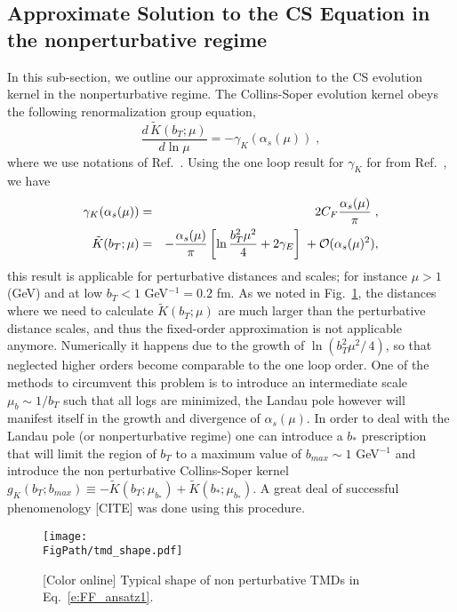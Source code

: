 \documentclass[final,3p,times,onecolumn,sort&compress,hidelinks]{elsarticle}
\newcommand*{\FigPath}{../Figs/}%
\begin{document}

\subsection{Approximate Solution to the CS Equation in the
	nonperturbative regime}

In this sub-section, we outline our approximate solution to the CS 
evolution kernel in the nonperturbative regime.  The Collins-Soper
evolution kernel obeys the following renormalization group equation,
%
\begin{equation}
\frac{d\, \tilde K (b_T;\mu)}{d \ln \mu} = - \gamma_K (\alpha_s(\mu)) \; ,
\end{equation} 
%
where we use notations of Ref.~\cite{Collins:2011zzd}. Using the one
loop result for $\gamma_K$ for from Ref.~\cite{Aybat:2011zv}, we have
%
\begin{eqnarray}
\gamma_K(\alpha_s(\mu)) &=& 2 C_F \frac{\alpha_s(\mu)}{\pi} \; ,\\
\tilde K (b_T;\mu) &=& -\frac{\alpha_s(\mu)}{\pi}  \left[\ln\frac{b_T^2 \mu^2}{4} + 2 \gamma_E
 \right] \; + {\cal O} (\alpha_s(\mu)^2),
 \label{e:CS_kernel}
\end{eqnarray}
%
this result is applicable for perturbative distances and scales; for 
instance $\mu > 1$ (GeV) and at low $b_T < 1$ GeV$^{-1} = 0.2$ fm. As we 
noted in Fig.~\ref{Fig:tmd_shape}, the distances where we need to 
calculate $\tilde K (b_T;\mu)$ are much larger than the perturbative 
distance scales, and thus the fixed-order approximation is not 
applicable anymore.  Numerically it happens due to the growth of 
$\ln\left(b_T^2 \mu^2/\, 4 \right) $, so that neglected higher orders 
become comparable to the one loop order. One of the methods to 
circumvent this problem is to introduce an intermediate scale $\mu_b 
\sim 1/b_T$ such that all logs are minimized, the Landau pole however 
will manifest itself in the growth and divergence of $\alpha_s(\mu)$. In 
order to deal with the Landau pole (or nonperturbative regime) one can 
introduce a $b_*$ prescription~\cite{Collins:2011zzd} that will limit 
the region of $b_T$ to a maximum value of $b_{max} \sim 1$ GeV$^{-1}$ 
and introduce the non perturbative Collins-Soper kernel $g_K(b_T; 
b_{max}) \equiv - \tilde K(b_T; \mu_{b_*}) + \tilde K(b_*; \mu_{b_*})$. 
A great deal of successful phenomenology [CITE] was done using this 
procedure.



\begin{figure}[htb!]
\centering
\texttt{[image: \\FigPath/tmd\_shape.pdf]}
\caption{\label{Fig:tmd_shape}
[Color online] Typical shape of non perturbative TMDs in Eq.~\eqref{e:FF_ansatz1}.
}
\end{figure}
\end{document}
